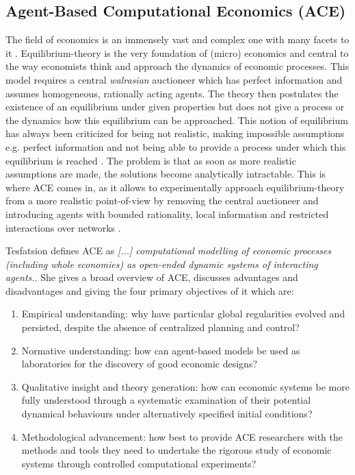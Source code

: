 \subsection{Agent-Based Computational Economics (ACE)}
The field of economics is an immensely vast and complex one with many facets to it \cite{bowles_understanding_2005}. Equilibrium-theory is the very foundation of (micro) economics \cite{colell_microeconomic_1995} and central to the way economists think and approach the dynamics of economic processes. This model requires a central \textit{walrasian} auctioneer which has perfect information and assumes homogeneous, rationally acting agents. The theory then postulates the existence of an equilibrium under given properties but does not give a process or the dynamics how this equilibrium can be approached. 
This notion of equilibrium has always been criticized for being not realistic, making impossible assumptions e.g. perfect information and not being able to provide a process under which this equilibrium is reached \cite{kirman_complex_2010}. The problem is that as soon as more realistic assumptions are made, the solutions become analytically intractable. This is where ACE comes in, as it allows to experimentally approach equilibrium-theory from a more realistic point-of-view by removing the central auctioneer and introducing agents with bounded rationality, local information and restricted interactions over networks \cite{farmer_economy_2009}. 

Tesfatsion \cite{tesfatsion_agent-based_2017} defines ACE as \textit{[...] computational modelling of economic processes (including whole economies) as open-ended dynamic systems of interacting agents.}. She gives a broad overview \cite{tesfatsion_agent-based_2006} of ACE, discusses advantages and disadvantages and giving the four primary objectives of it which are:

\begin{enumerate}
	\item Empirical understanding: why have particular global regularities evolved and persisted, despite the absence of centralized planning and control?
	\item Normative understanding: how can agent-based models be used as laboratories for the discovery of good economic designs?
	\item Qualitative insight and theory generation: how can economic systems be more fully understood through a systematic examination of their potential dynamical behaviours under alternatively specified initial conditions?
	\item Methodological advancement: how best to provide ACE researchers with the methods and tools they need to undertake the rigorous study of economic systems through controlled computational experiments?
\end{enumerate}

